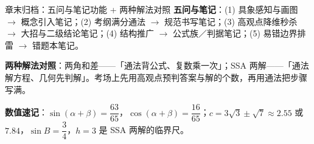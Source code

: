 
\begin{notezone}{章末归档：五问与笔记功能 + 两种解法对照}
\textbf{五问与笔记}：(1) 具象感知与画图 $\to$ 概念引入笔记；(2) 考纲满分通法 $\to$ 规范书写笔记；(3) 高观点降维秒杀 $\to$ 大招与二级结论笔记；(4) 结构推广 $\to$ 公式族／判据笔记；(5) 易错边界排雷 $\to$ 错题本笔记。

\textbf{两种解法对照}：两角和差——「通法背公式、复数乘一次」；SSA 两解——「通法解方程、几何先判解」。考场上先用高观点预判答案与解的个数，再用通法把步骤写满。

\textbf{数值速记}：$\sin(\alpha+\beta)=\dfrac{63}{65}$，$\cos(\alpha+\beta)=\dfrac{16}{65}$；$c=3\sqrt3\pm\sqrt7\approx2.55$ 或 $7.84$，$\sin B=\dfrac34$，$h=3$ 是 SSA 两解的临界尺。
\end{notezone}
